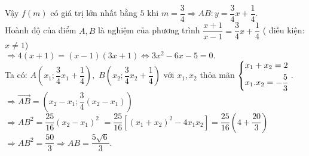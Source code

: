 \begin{ex}
{
{
}
Vậy $ f(m) $ có giá trị lớn nhất bằng $ 5 $ khi $ m=\dfrac{3}{4}\Rightarrow AB: y=\dfrac{3}{4}x+\dfrac{1}{4}. $\\
Hoành độ của điểm $ A, B $ là nghiệm của phương trình $ \dfrac{x+1}{x-1}=\dfrac{3}{4} x+\dfrac{1}{4} $ ( điều kiện: $ x\neq 1 $)\\
$ \Rightarrow 4(x+1)=(x-1)(3x+1)\Leftrightarrow 3x^2-6x-5=0.$\\
Ta có: $ A\left(x_1;\dfrac{3}{4}x_1+\dfrac{1}{4}\right), $ $ B\left(x_2;\dfrac{3}{4}x_2+\dfrac{1}{4}\right) $ với $ x_1, x_2 $ thỏa mãn $ \left\{\begin{aligned}&x_1+x_2=2\\&x_1.x_2=-\dfrac{5}{3}\end{aligned}\right.. $\\
$ \Rightarrow \overrightarrow{AB}=\left(x_2-x_1;\dfrac{3}{4}(x_2-x_1)\right)$ \\
$\Rightarrow AB^2=\dfrac{25}{16}(x_2-x_1)^2 $
$ =\dfrac{25}{16}\left[(x_1+x_2)^2-4x_1x_2\right]=\dfrac{25}{16}\left(4+\dfrac{20}{3}\right) $\\
$ \Rightarrow AB^2=\dfrac{50}{3}\Rightarrow AB=\dfrac{5\sqrt{6}}{3}. $
}
\end{ex}
